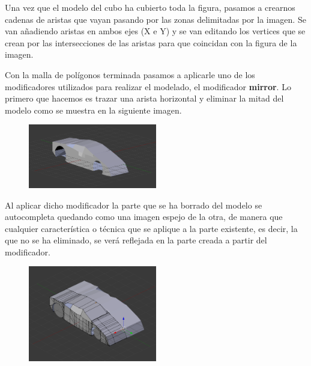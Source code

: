 \documentclass[10pt]{article}
\begin{document}
Una vez que el modelo del cubo ha cubierto toda la figura, pasamos a crearnos cadenas de aristas que vayan pasando por las zonas delimitadas por la imagen. Se van añadiendo aristas en ambos ejes (X e Y) y se van editando los vertices que se crean por las intersecciones de las aristas para que coincidan con la figura de la imagen.

Con la malla de polígonos terminada pasamos a aplicarle uno de los modificadores utilizados para realizar el modelado, el modificador  \textbf{mirror}. Lo primero que hacemos es trazar una arista horizontal y eliminar la mitad del modelo como se muestra en la siguiente imagen.\\

\begin{figure}[H]
	\begin{center}
 		\includegraphics[width = 0.5\textwidth]{Imagenes/mirror.eps}
	\end{center} 
\end{figure}


Al aplicar dicho modificador la parte que se ha borrado del modelo se autocompleta quedando como una imagen espejo de la otra, de manera que cualquier característica o técnica que se aplique a la parte existente, es decir, la que no se ha eliminado, se verá reflejada en la parte creada a partir del modificador. \\

\begin{figure}[H]
	\begin{center}
 		\includegraphics[width = 0.5\textwidth]{Imagenes/mirror2.eps}
	\end{center} 
\end{figure}
\end{document}
